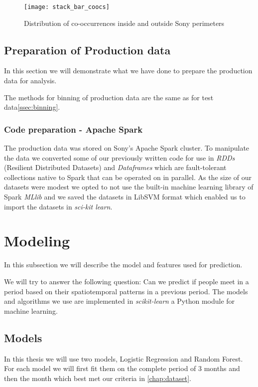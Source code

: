 \begin{figure}[H]
    \hspace*{-1.0cm}
    \centering
    \texttt{[image: stack\_bar\_coocs]}
    \caption{Distribution of co-occurrences inside and outside Sony perimeters}
    \label{fig:dist_coocs_sony}
\end{figure}

\subsection{Preparation of Production data}
In this section we will demonstrate what we have done to prepare the production data for analysis.

The methods for binning of production data are the same as for test data\ref{ssec:binning}.

\subsubsection{Code preparation - Apache Spark}
The production data was stored on Sony's Apache Spark\cite{spark} cluster.
To manipulate the data we converted some of our previously written code for use in \textit{RDDs} (Resilient Distributed Datasets) and \textit{Dataframes} which are fault-tolerant collections native to Spark that can be operated on in parallel.
As the size of our datasets were modest we opted to not use the built-in machine learning library of Spark \textit{MLlib} and we saved the datasets in LibSVM format which enabled us to import the datasets in \textit{sci-kit learn}.

\section{Modeling}
In this subsection we will describe the model and features used for prediction.

We will try to answer the following question: Can we predict if people meet in a period based on their spatiotemporal patterns in a previous period.
The models and algorithms we use are implemented in \textit{scikit-learn}\cite{scikit-learn} a Python module for machine learning. 

\subsection{Models}
In this thesis we will use two models, Logistic Regression and Random Forest. For each model we will first fit them on the complete period of 3 months and then the month which best met our criteria in \autoref{chap:dataset}.

